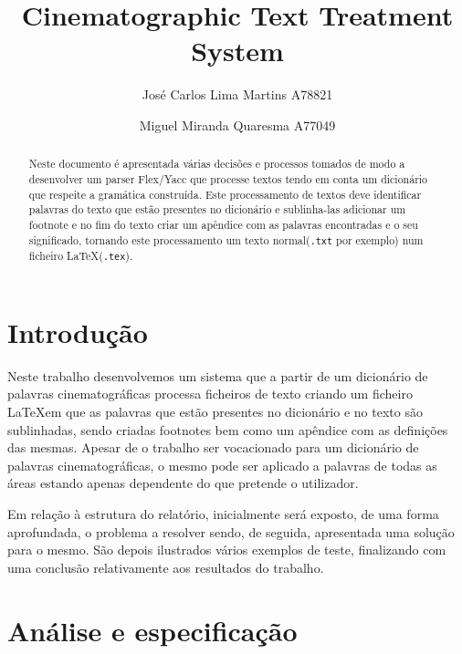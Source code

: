 \documentclass{llncs}
\begin{document}
 \mainmatter
\title{Cinematographic Text Treatment System}
\author{José Carlos Lima Martins A78821 \and
        Miguel Miranda Quaresma A77049}

\maketitle

\justify

\begin{abstract}
Neste documento é apresentada várias decisões e processos tomados de modo a desenvolver um parser Flex/Yacc que processe textos tendo em conta um dicionário que respeite a gramática construída. Este processamento de textos deve identificar palavras do texto que estão presentes no dicionário e sublinha-las adicionar um footnote e no fim do texto criar um apêndice com as palavras encontradas e o seu significado, tornando este processamento um texto normal(\verb|.txt| por exemplo) num ficheiro \LaTeX(\verb|.tex|).
\end{abstract}

\section{Introdução}
Neste trabalho desenvolvemos um sistema que a partir de um dicionário de palavras cinematográficas processa ficheiros de texto criando um ficheiro \LaTeX em que as palavras que estão presentes no dicionário e no texto são sublinhadas, sendo criadas footnotes bem como um apêndice com as definições das mesmas. Apesar de o trabalho ser vocacionado para um dicionário de palavras cinematográficas, o mesmo pode ser aplicado a palavras de todas as áreas estando apenas dependente do que pretende o utilizador.

Em relação à estrutura do relatório, inicialmente será exposto, de uma forma aprofundada, o problema a resolver sendo, de seguida, apresentada uma solução para o mesmo. São depois ilustrados vários exemplos de teste, finalizando com uma conclusão relativamente aos resultados do trabalho.

\section{Análise e especificação}
\end{document}
